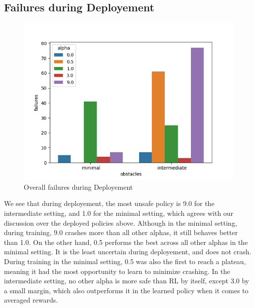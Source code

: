   \subsection{Failures during Deployement}


\begin{figure}[H]
    \centering
    \includegraphics[scale=0.8]{figures/sfe-deployement.png}
    \caption{Overall failures during Deployement}
    \label{fig:sfe}
  \end{figure}

  We see that during deployement, the most unsafe policy is 9.0 for the intermediate setting, and 1.0 for the minimal setting, which agrees with our discussion over the deployed policies above. 
  Although in the minimal setting, during training, 9.0 crashes more than all other alphas, it still behaves better than 1.0.
  On the other hand, 0.5 performs the best across all other alphas in the minimal setting. It is the least uncertain during deployement, and does not crash.
  During training in the minimal setting, 0.5 was also the first to reach a plateau, meaning it had the most opportunity to learn to minimize crashing. 
  In the intermediate setting, no other alpha is more safe than RL by itself, except 3.0 by a small margin, which also outperforms it in the learned policy when it comes to averaged rewards.


